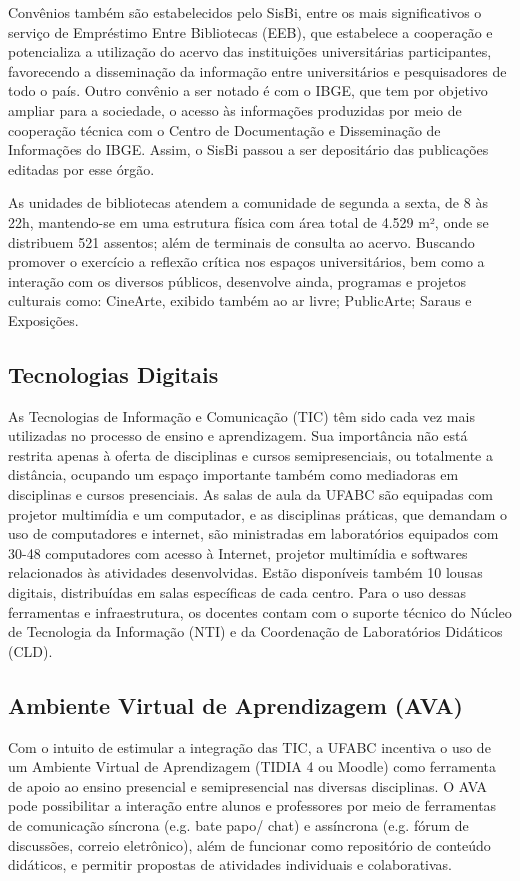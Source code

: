 \documentclass{article}
\begin{document}
Convênios também são estabelecidos pelo SisBi, entre os mais significativos o serviço de Empréstimo Entre Bibliotecas (EEB), que estabelece a cooperação e potencializa a utilização do acervo das instituições universitárias participantes, favorecendo a disseminação da informação entre universitários e pesquisadores de todo o país. Outro convênio a ser notado é com o IBGE, que tem por objetivo ampliar para a sociedade, o acesso às informações produzidas por meio de cooperação técnica com o Centro de Documentação e Disseminação de Informações do IBGE. Assim, o SisBi passou a ser depositário das publicações editadas por esse órgão.

As unidades de bibliotecas atendem a comunidade de segunda a sexta, de 8 às 22h, mantendo-se em uma estrutura física com área total de 4.529 m², onde se distribuem 521 assentos; além de terminais de consulta ao acervo. Buscando promover o exercício a reflexão crítica nos espaços universitários, bem como a interação com os diversos públicos, desenvolve ainda, programas e projetos culturais como: CineArte, exibido também ao ar livre; PublicArte; Saraus e Exposições.

\subsection{Tecnologias Digitais}

As Tecnologias de Informação e Comunicação (TIC) têm sido cada vez mais utilizadas no processo de ensino e aprendizagem. Sua importância não está restrita apenas à oferta de disciplinas e cursos semipresenciais, ou totalmente a distância, ocupando um espaço importante também como mediadoras em disciplinas e cursos presenciais.
As salas de aula da UFABC são equipadas com projetor multimídia e um computador, e as disciplinas práticas, que demandam o uso de computadores e internet, são ministradas em laboratórios equipados com 30-48 computadores com acesso à Internet, projetor multimídia e softwares relacionados às atividades desenvolvidas. Estão disponíveis também 10 lousas digitais, distribuídas em salas específicas de cada centro. Para o uso dessas ferramentas e infraestrutura, os docentes contam com o suporte técnico do Núcleo de Tecnologia da Informação (NTI) e da Coordenação de Laboratórios Didáticos (CLD).

\subsection{Ambiente Virtual de Aprendizagem (AVA)}
Com o intuito de estimular a integração das TIC, a UFABC incentiva o uso de um Ambiente Virtual de Aprendizagem (TIDIA 4 ou Moodle) como ferramenta de apoio ao ensino presencial e semipresencial nas diversas disciplinas. O AVA pode possibilitar a interação entre alunos e professores por meio de ferramentas de comunicação síncrona (e.g. bate papo/ chat) e assíncrona (e.g. fórum de discussões, correio eletrônico), além de funcionar como repositório de conteúdo didáticos, e permitir propostas de atividades individuais e colaborativas.
\end{document}
